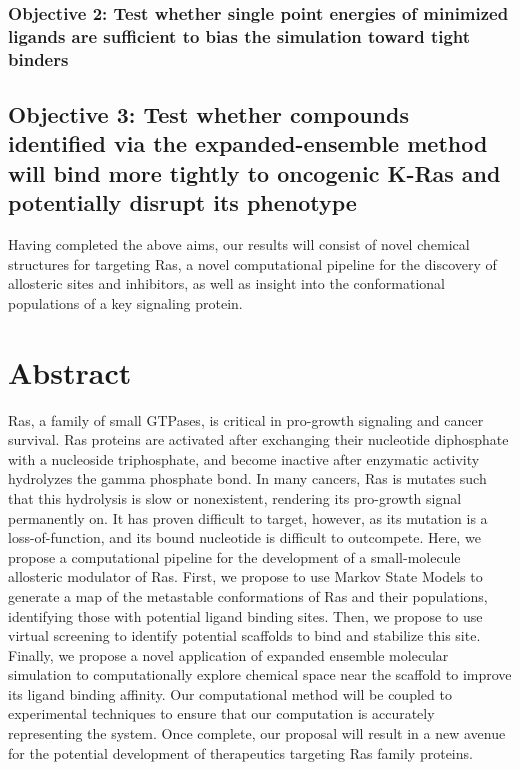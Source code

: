 \documentclass[12pt]{article}
\begin{document}
  \subsubsection*{Objective 2: Test whether single point energies of minimized ligands are sufficient to bias the simulation toward tight binders }
  \subsection*{Objective 3: Test whether compounds identified via the expanded-ensemble method will bind more tightly to oncogenic K-Ras and potentially disrupt its phenotype}
  
  Having completed the above aims, our results will consist of novel chemical structures for targeting Ras, a novel computational pipeline for the discovery of allosteric sites and inhibitors, as well as insight into the conformational populations of a key signaling protein.
  
  
  
  
  
  
  
  \clearpage





\section*{Abstract}
Ras, a family of small GTPases, is critical in pro-growth signaling and cancer survival. Ras proteins are activated after exchanging their nucleotide diphosphate with a nucleoside triphosphate, and become inactive after enzymatic activity hydrolyzes the gamma phosphate bond. In many cancers, Ras is mutates such that this hydrolysis is slow or nonexistent, rendering its pro-growth signal permanently on. It has proven difficult to target, however, as its mutation is a loss-of-function, and its bound nucleotide is difficult to outcompete. Here, we propose a computational pipeline for the development of a small-molecule allosteric modulator of Ras. First, we propose to use Markov State Models to generate a map of the metastable conformations of Ras and their populations, identifying those with potential ligand binding sites. Then, we propose to use virtual screening to identify potential scaffolds to bind and stabilize this site. Finally, we propose a novel application of expanded ensemble molecular simulation to computationally explore chemical space near the scaffold to improve its ligand binding affinity. Our computational method will be coupled to experimental techniques to ensure that our computation is accurately representing the system. Once complete, our proposal will result in a new avenue for the potential development of therapeutics targeting Ras family proteins. 
\end{document}
